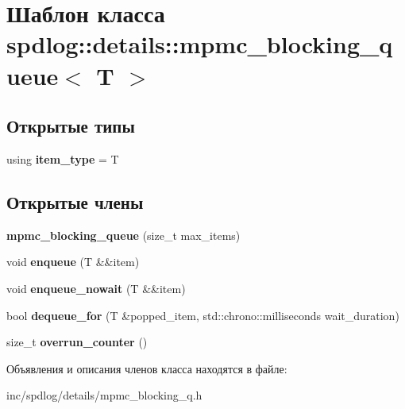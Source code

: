 \hypertarget{classspdlog_1_1details_1_1mpmc__blocking__queue}{}\section{Шаблон класса spdlog\+:\+:details\+:\+:mpmc\+\_\+blocking\+\_\+queue$<$ T $>$}
\label{classspdlog_1_1details_1_1mpmc__blocking__queue}
\subsection*{Открытые типы}
\begin{DoxyCompactItemize}
\item 
\mbox{\label{classspdlog_1_1details_1_1mpmc__blocking__queue_abb22a6f25c5fd96af5b163dc93eec397}} 
using {\bfseries item\+\_\+type} = T
\end{DoxyCompactItemize}
\subsection*{Открытые члены}
\begin{DoxyCompactItemize}
\item 
\mbox{\label{classspdlog_1_1details_1_1mpmc__blocking__queue_ace609561c8f631202988ec49f95422fa}} 
{\bfseries mpmc\+\_\+blocking\+\_\+queue} (size\+\_\+t max\+\_\+items)
\item 
\mbox{\label{classspdlog_1_1details_1_1mpmc__blocking__queue_a3795640b651fcb2de66a21ef2bc221f1}} 
void {\bfseries enqueue} (T \&\&item)
\item 
\mbox{\label{classspdlog_1_1details_1_1mpmc__blocking__queue_a1280489c9035a705f50f04905a5ed394}} 
void {\bfseries enqueue\+\_\+nowait} (T \&\&item)
\item 
\mbox{\label{classspdlog_1_1details_1_1mpmc__blocking__queue_af4015ea1657b393755f34d76c97a28d1}} 
bool {\bfseries dequeue\+\_\+for} (T \&popped\+\_\+item, std\+::chrono\+::milliseconds wait\+\_\+duration)
\item 
\mbox{\label{classspdlog_1_1details_1_1mpmc__blocking__queue_a15e3d12dff953034d5aad5590b8282cd}} 
size\+\_\+t {\bfseries overrun\+\_\+counter} ()
\end{DoxyCompactItemize}


Объявления и описания членов класса находятся в файле\+:\begin{DoxyCompactItemize}
\item 
inc/spdlog/details/mpmc\+\_\+blocking\+\_\+q.\+h\end{DoxyCompactItemize}
